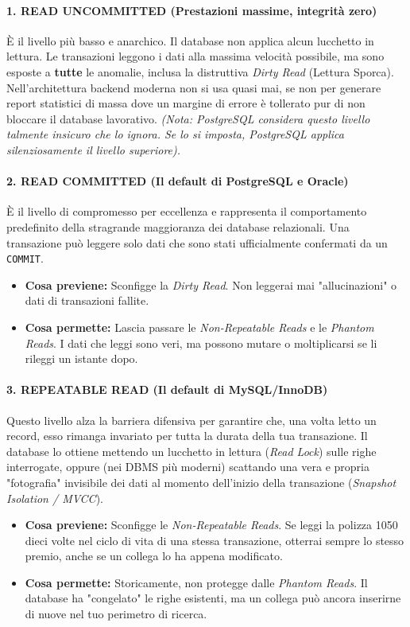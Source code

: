 \paragraph{1. READ UNCOMMITTED (Prestazioni massime, integrità zero)}
È il livello più basso e anarchico. Il database non applica alcun lucchetto in lettura. Le transazioni leggono i dati alla massima velocità possibile, ma sono esposte a \textbf{tutte} le anomalie, inclusa la distruttiva \textit{Dirty Read} (Lettura Sporca). 
Nell'architettura backend moderna non si usa quasi mai, se non per generare report statistici di massa dove un margine di errore è tollerato pur di non bloccare il database lavorativo.
\textit{(Nota: PostgreSQL considera questo livello talmente insicuro che lo ignora. Se lo si imposta, PostgreSQL applica silenziosamente il livello superiore).}

\paragraph{2. READ COMMITTED (Il default di PostgreSQL e Oracle)}
È il livello di compromesso per eccellenza e rappresenta il comportamento predefinito della stragrande maggioranza dei database relazionali. 
Una transazione può leggere solo dati che sono stati ufficialmente confermati da un \texttt{COMMIT}.
\begin{itemize}
    \item \textbf{Cosa previene:} Sconfigge la \textit{Dirty Read}. Non leggerai mai "allucinazioni" o dati di transazioni fallite.
    \item \textbf{Cosa permette:} Lascia passare le \textit{Non-Repeatable Reads} e le \textit{Phantom Reads}. I dati che leggi sono veri, ma possono mutare o moltiplicarsi se li rileggi un istante dopo.
\end{itemize}

\paragraph{3. REPEATABLE READ (Il default di MySQL/InnoDB)}
Questo livello alza la barriera difensiva per garantire che, una volta letto un record, esso rimanga invariato per tutta la durata della tua transazione. Il database lo ottiene mettendo un lucchetto in lettura (\textit{Read Lock}) sulle righe interrogate, oppure (nei DBMS più moderni) scattando una vera e propria "fotografia" invisibile dei dati al momento dell'inizio della transazione (\textit{Snapshot Isolation / MVCC}).
\begin{itemize}
    \item \textbf{Cosa previene:} Sconfigge le \textit{Non-Repeatable Reads}. Se leggi la polizza 1050 dieci volte nel ciclo di vita di una stessa transazione, otterrai sempre lo stesso premio, anche se un collega lo ha appena modificato.
    \item \textbf{Cosa permette:} Storicamente, non protegge dalle \textit{Phantom Reads}. Il database ha "congelato" le righe esistenti, ma un collega può ancora inserirne di nuove nel tuo perimetro di ricerca.
\end{itemize}

